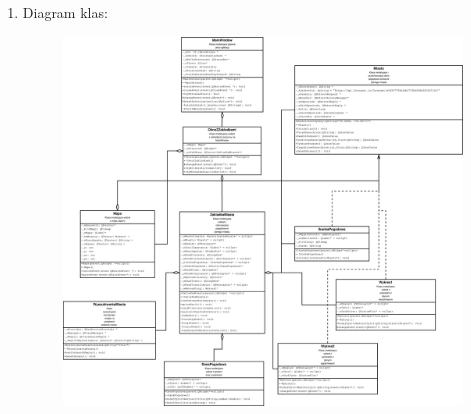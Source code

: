 \documentclass[a4paper]{article}
\begin{document}
\begin{enumerate}
\pagebreak
\item Diagram klas:\\
\begin{figure}[H]
\includegraphics[width=14cm]{diagram_klas.eps}
\end{figure}

\end{enumerate}
\end{document}
